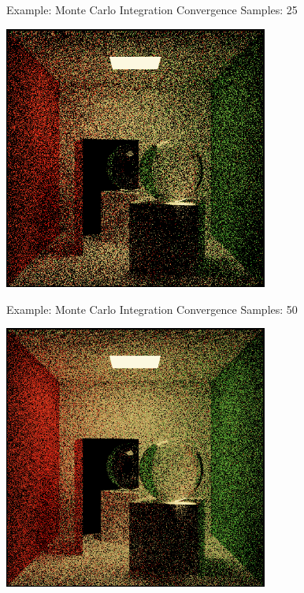 \documentclass{beamer}
\begin{document}
\begin{frame}{Example: Monte Carlo Integration Convergence}
    Samples: 25
    \begin{center}
        \includegraphics[width=0.65\textwidth]{../img/convergence/cornell-00025.png}
    \end{center}
\end{frame}

\begin{frame}{Example: Monte Carlo Integration Convergence}
    Samples: 50
    \begin{center}
        \includegraphics[width=0.65\textwidth]{../img/convergence/cornell-00050.png}
    \end{center}
\end{frame}
\end{document}
